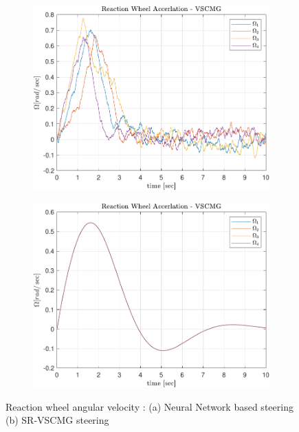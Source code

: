 \begin{figure}[ht]
     \centering
     \begin{subfigure}[b]{0.49\textwidth}
         \centering
         \includegraphics[width=\textwidth,trim={0 0 0 0.35cm},clip]{figures/plots/Results/vs-nn-Omg.pdf}
          \caption{}
         \label{fig:nn_Omg}
     \end{subfigure}
     \begin{subfigure}[b]{0.49\textwidth}
         \centering
         \includegraphics[width=\textwidth,trim={0 0 0 0.35cm},clip]{figures/plots/Results/vs-vs-Omg.pdf}
          \caption{}
         \label{fig:vs_Omg}
     \end{subfigure}
     
        \caption{Reaction wheel angular velocity : (a) Neural Network based steering (b) SR-VSCMG steering}
        \label{fig:nnvscmg_Omg}
\end{figure}

